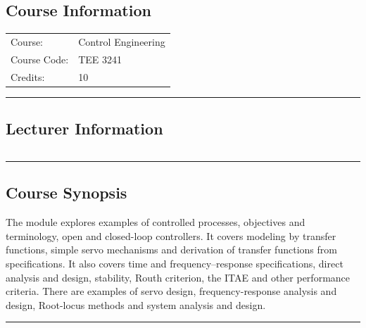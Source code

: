 
\subsection*{Course Information}\label{course:3241}
\vspace{0ex}%
\noindent\parbox{0.5\textwidth}{%
    \noindent\begin{tabular}{@{}ll}
                 \textsf{Course:}          & 	Control Engineering \\
                 \textsf{Course Code:}         & 	TEE 3241    \\
                 \textsf{Credits:}    & 	10
    \end{tabular}}
\vspace{2ex}\hrule\vspace{2ex}

\subsection*{Lecturer Information}
\noindent\parbox{0.5\textwidth}{%
    \noindent\begin{tabular}{@{}ll}
                 
    \end{tabular}}
\vspace{2ex}\hrule\vspace{2ex}


\subsection*{Course Synopsis}
The module explores examples of controlled processes, objectives and terminology, open and closed-loop controllers.
It covers modeling by transfer functions, simple servo mechanisms and derivation of transfer functions from specifications.
It also covers time and frequency–response specifications, direct analysis and design, stability, Routh criterion, the ITAE and other performance criteria.
There are examples of servo design,  frequency-response analysis and design, Root-locus methods and system analysis and design.
\vspace{2ex}\hrule\vspace{2ex}


